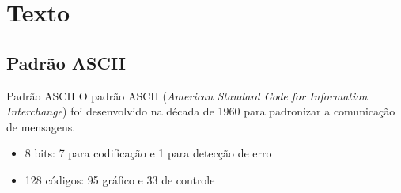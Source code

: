 
\lecturetitle{\insertlecture}{\course}

\frame{\maketitle}

\section{Texto}

\subsection{Padrão ASCII}

\begin{frame}{Padrão ASCII}
  O padrão \alert{ASCII} ({\em American Standard Code for Information
    Interchange}) foi desenvolvido na década de 1960 para padronizar a
  comunicação de mensagens.

  \begin{itemize}
  \item 8 bits: 7 para codificação e 1 para detecção de erro
  \item 128 códigos: 95 gráfico e 33 de controle
  \end{itemize}

\end{frame}

